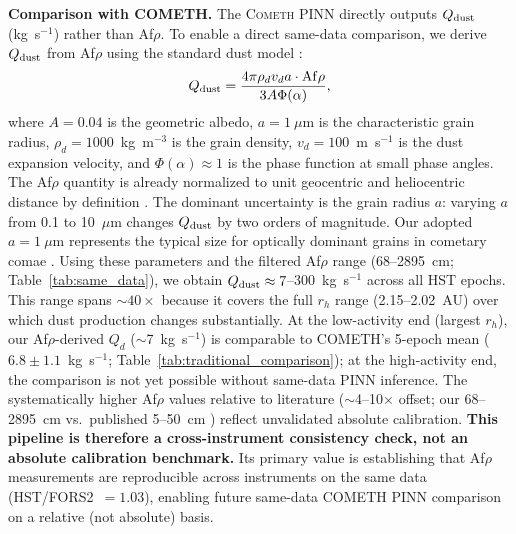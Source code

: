 \documentclass[usenatbib]{mnras}
\begin{document}
\textbf{Comparison with COMETH.} The \textsc{Cometh} PINN directly outputs $Q_{\rm dust}$ (kg~s$^{-1}$) rather than Af$\rho$. To enable a direct same-data comparison, we derive $Q_{\rm dust}$ from Af$\rho$ using the standard dust model \citep{ahearn95,lamy04}:
\begin{equation}\label{eq:afrho_to_qdust}
Q_{\rm dust} = \frac{4\pi \rho_d v_d a \cdot {\rm Af}\rho}{3 A \Phi(\alpha)},
\end{equation}
where $A=0.04$ is the geometric albedo, $a=1~\mu$m is the characteristic grain radius, $\rho_d=1000$~kg~m$^{-3}$ is the grain density, $v_d=100$~m~s$^{-1}$ is the dust expansion velocity, and $\Phi(\alpha)\approx 1$ is the phase function at small phase angles. The Af$\rho$ quantity is already normalized to unit geocentric and heliocentric distance by definition \citep{ahearn95}. The dominant uncertainty is the grain radius $a$: varying $a$ from 0.1 to 10~$\mu$m changes $Q_{\rm dust}$ by two orders of magnitude. Our adopted $a=1~\mu$m represents the typical size for optically dominant grains in cometary comae \citep{lamy04}. Using these parameters and the filtered Af$\rho$ range (68--2895~cm; Table~\ref{tab:same_data}), we obtain $Q_{\rm dust} \approx 7$--$300$~kg~s$^{-1}$ across all HST epochs. This range spans $\sim 40\times$ because it covers the full $r_h$ range (2.15--2.02~AU) over which dust production changes substantially. At the low-activity end (largest $r_h$), our Af$\rho$-derived $Q_d$ ($\sim$7~kg~s$^{-1}$) is comparable to COMETH's 5-epoch mean ($6.8\pm1.1$~kg~s$^{-1}$; Table~\ref{tab:traditional_comparison}); at the high-activity end, the comparison is not yet possible without same-data PINN inference. The systematically higher Af$\rho$ values relative to literature ($\sim$4--10$\times$ offset; our 68--2895~cm vs.\ published 5--50~cm \citep{jewitt20,guzik19}) reflect unvalidated absolute calibration. \textbf{This pipeline is therefore a cross-instrument consistency check, not an absolute calibration benchmark.} Its primary value is establishing that Af$\rho$ measurements are reproducible across instruments on the same data (HST/FORS2~$=1.03$), enabling future same-data COMETH PINN comparison on a relative (not absolute) basis.
\end{document}
